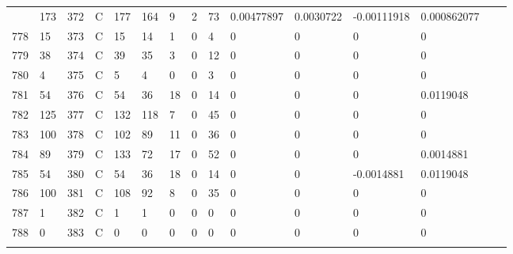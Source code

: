 \begin{longtable}{lllllllllllllll}
\begin{comment}
	777 & 173               & 372 & C   & 177               & 164               & 9                 & 2    & 73         & 0.00477897     & 0.0030722      & -0.00111918   & 0.000862077  \\
	778 & 15                & 373 & C   & 15                & 14                & 1                 & 0    & 4          & 0              & 0              & 0             & 0            \\
	779 & 38                & 374 & C   & 39                & 35                & 3                 & 0    & 12         & 0              & 0              & 0             & 0            \\
	780 & 4                 & 375 & C   & 5                 & 4                 & 0                 & 0    & 3          & 0              & 0              & 0             & 0            \\
	781 & 54                & 376 & C   & 54                & 36                & 18                & 0    & 14         & 0              & 0              & 0             & 0.0119048    \\
	782 & 125               & 377 & C   & 132               & 118               & 7                 & 0    & 45         & 0              & 0              & 0             & 0            \\
	783 & 100               & 378 & C   & 102               & 89                & 11                & 0    & 36         & 0              & 0              & 0             & 0            \\
	784 & 89                & 379 & C   & 133               & 72                & 17                & 0    & 52         & 0              & 0              & 0             & 0.0014881    \\
	785 & 54                & 380 & C   & 54                & 36                & 18                & 0    & 14         & 0              & 0              & -0.0014881    & 0.0119048    \\
	786 & 100               & 381 & C   & 108               & 92                & 8                 & 0    & 35         & 0              & 0              & 0             & 0            \\
	787 & 1                 & 382 & C   & 1                 & 1                 & 0                 & 0    & 0          & 0              & 0              & 0             & 0            \\
	788 & 0                 & 383 & C   & 0                 & 0                 & 0                 & 0    & 0          & 0              & 0              & 0             & 0            \\

\end{comment}
\end{longtable}
